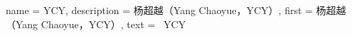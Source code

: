 
{
  name = {YCY},
  description = {杨超越（Yang Chaoyue，YCY）},
  first = {杨超越（Yang Chaoyue，YCY）},
  text = {~YCY~}
}


